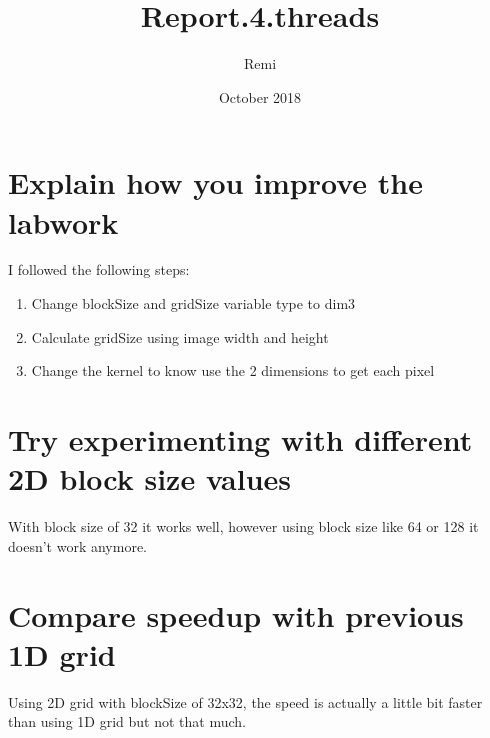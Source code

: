 \documentclass{article}
\title{Report.4.threads}
\author{Remi}
\date{October 2018}
\begin{document}
\maketitle

\section{Explain how you improve the labwork}

I followed the following steps:
\begin{enumerate}  
\item Change blockSize and gridSize variable type to dim3
\item Calculate gridSize using image width and height
\item Change the kernel to know use the 2 dimensions to get each pixel
\end{enumerate}

\section{Try experimenting with different 2D block size values}

With block size of 32 it works well, however using block size like 64 or 128 it doesn't work anymore.


\section{Compare speedup with previous 1D grid}

Using 2D grid with blockSize of 32x32, the speed is actually a little bit faster than using 1D grid but not that much.
\end{document}
